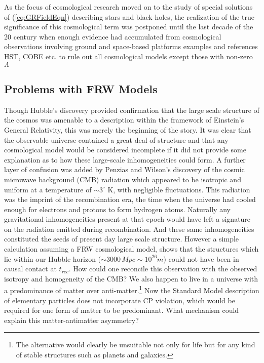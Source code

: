\begin{doublespace}
As the focus of cosmological research moved on to the study of special
solutions of (\ref{eq:GRFieldEqn}) describing stars and black holes,
the realization of the true significance of this cosmological term
was postponed until the last decade of the 20 century when enough
evidence had accumulated from cosmological observations involving
ground and space-based platforms examples and references HST, COBE etc. to rule out all cosmological models except those with non-zero $\Lambda$ \cite{Spergel2006Wilkinson}

\subsection{Problems with FRW Models}

Though Hubble's discovery provided confirmation that the large scale structure of the cosmos was amenable to a description within the framework of Einstein's General Relativity, this was merely the beginning of the story. It was clear that the observable universe contained a great deal of structure and that any cosmological model would be considered incomplete if it did not provide some explanation as to how these large-scale inhomogeneities could form. A further layer of confusion was added by Penzias and Wilson's discovery \cite{Penzias1965A-Measurement} of the cosmic microwave background (CMB) radiation which appeared to be isotropic and uniform at a temperature of $\sim 3^{\circ}$ K, with negligible fluctuations. This radiation was the imprint of the recombination era, the time when the universe had cooled enough for electrons and protons to form hydrogen atoms. Naturally any gravitational inhomogeneities present at that epoch would have left a signature on the radiation emitted during recombination. And these same inhomogeneities constituted the seeds of present day large scale structure. However a simple calculation assuming a FRW cosmological model, shows that the structures which lie within our Hubble horizon ($\sim 3000 \, Mpc \sim 10^{26} m$) could not have been in causal contact at $t_{rec}$. How could one reconcile this observation with the observed isotropy and homogeneity of the CMB? We also happen to live in a universe with a predominance of matter over anti-matter.\footnote{The alternative would clearly be unsuitable not only for life but for any kind of stable structures such as planets and galaxies.} Now the Standard Model description of elementary particles does not incorporate CP violation, which would be required for one form of matter to be predominant. What mechanism could explain this matter-antimatter asymmetry?


\end{doublespace}
